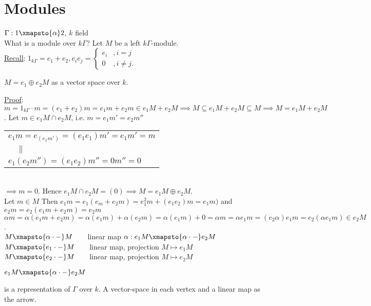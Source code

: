 \section{Modules}

\begin{exam}
\(\Gamma :1\xmapsto{\alpha} 2\), \(k\) field\\
What is a module over \(k\Gamma\)? Let \(M\) be a left \(k\Gamma\)-module.\\
\underline{Recall}: \(1_{k\Gamma} = e_1 + e_2, e_ie_j = \begin{cases}
    e_i &, i=j \\
    0\, & ,i\not=j.
\end{cases}\)\\
\begin{prop}
 \(M = e_1\oplus e_2M\) as a vector space over \(k\).
\end{prop}
\noindent\underline{Proof}: \(m = 1_{k\Gamma}\cdot m = (e_1 + e_2)m = e_1m + e_2m \in e_1M + e_2M \implies M\subseteq e_1M + e_2M \subseteq M \implies M = e_1M + e_2M\). Let \(m\in e_1M\cap e_2M\), i.e. \(m = e_1m' = e_2m''\)\\[0.5cm]
\begin{tabular}{l}
     \(e_1m = e_(e_1m') = (e_1e_1)m' = e_1m' = m\)  \\
     \(\quad\parallel\) \\
     \(e_1(e_2m'') = (e_1e_2)m'' = 0m'' = 0\)
\end{tabular}\\[0.5cm]
\(\implies m= 0.\) Hence \(e_1M\cap e_2M = (0) \implies M = e_1M \oplus e_2M\).\\
Let \(m\in M\) Then \(e_1m = e_1(e_m + e_2m) = e_1^2m + (e_1e_2)m = e_1m)\) and \(e_2m = e_2(e_1m + e_2m) = e_2m\)\\
\(\alpha m = \alpha(e_1m + e_2m) = \alpha(e_1m) + \alpha(e_2m) = \alpha(e_1m) + 0 = \alpha m = \alpha e_1 m = (e_2\alpha)e_1m = e_2(\alpha e_1 m)\in e_2M\).\\[1cm]
\(M \xmapsto{\alpha\cdot-} M \quad\quad\)linear map \(\alpha:e_1M\xmapsto{\alpha\cdot-}e_2M\)\\
\(M\xmapsto{e_1\cdot-}M\quad\quad\)linear map, projection \(M\mapsto e_1M\)\\
\(M\xmapsto{e_2\cdot-}M\quad\quad\)linear map, projection \(M\mapsto e_2M\)\\

\begin{center}
\(e_1M \xmapsto{\alpha\cdot -}e_2M\)
\end{center}
is a representation of \(\Gamma\) over \(k\). A vector-space in each vertex and a linear map as the arrow.
\end{exam}
